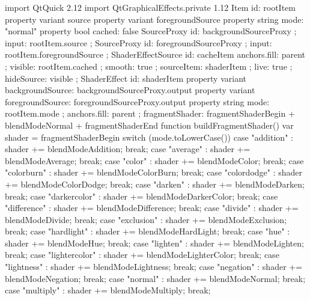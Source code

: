 \label{f000050}    %
\FloatBarrier                                  %
\begin{thebookfilesourceone}[escapeinside={(*@}{@*)},
caption=GoodLuck,
title=\filesourcenumbernameone \thefilesourcenumber
]
import QtQuick 2.12
import QtGraphicalEffects.private 1.12
Item {
    id: rootItem
    property variant source
    property variant foregroundSource
    property string mode: "normal"
    property bool cached: false
    SourceProxy {
        id: backgroundSourceProxy ;
        input: rootItem.source ; }
    SourceProxy {
        id: foregroundSourceProxy ;
        input: rootItem.foregroundSource ; }
    ShaderEffectSource {
        id: cacheItem
        anchors.fill: parent ; visible: rootItem.cached ;
        smooth: true ; sourceItem: shaderItem ;
        live: true ; hideSource: visible ; }
    ShaderEffect {
        id: shaderItem
        property variant backgroundSource: backgroundSourceProxy.output
        property variant foregroundSource: foregroundSourceProxy.output
        property string mode: rootItem.mode ; anchors.fill: parent ;
        fragmentShader: fragmentShaderBegin + blendModeNormal + fragmentShaderEnd
        function buildFragmentShader() {
            var shader = fragmentShaderBegin
            switch (mode.toLowerCase()) {
            case "addition" : shader += blendModeAddition; break;
            case "average" : shader += blendModeAverage; break;
            case "color" : shader += blendModeColor; break;
            case "colorburn" : shader += blendModeColorBurn; break;
            case "colordodge" : shader += blendModeColorDodge; break;
            case "darken" : shader += blendModeDarken; break;
            case "darkercolor" : shader += blendModeDarkerColor; break;
            case "difference" : shader += blendModeDifference; break;
            case "divide" : shader += blendModeDivide; break;
            case "exclusion" : shader += blendModeExclusion; break;
            case "hardlight" : shader += blendModeHardLight; break;
            case "hue" : shader += blendModeHue; break;
            case "lighten" : shader += blendModeLighten; break;
            case "lightercolor" : shader += blendModeLighterColor; break;
            case "lightness" : shader += blendModeLightness; break;
            case "negation" : shader += blendModeNegation; break;
            case "normal" : shader += blendModeNormal; break;
            case "multiply" : shader += blendModeMultiply; break;
}}}}
\end{thebookfilesourceone}
